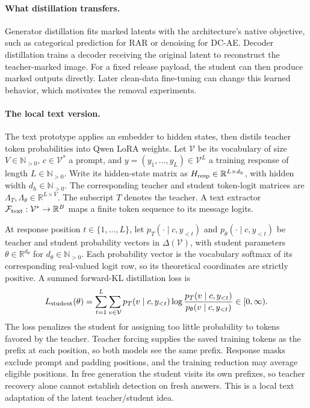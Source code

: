\paragraph{What distillation transfers.}
Generator distillation fits marked latents with the architecture's native objective, such as categorical prediction for RAR or denoising for DC-AE. Decoder distillation trains a decoder receiving the original latent to reconstruct the teacher-marked image. For a fixed release payload, the student can then produce marked outputs directly. Later clean-data fine-tuning can change this learned behavior, which motivates the removal experiments.

\paragraph{The local text version.}
The text prototype applies an embedder to hidden states, then distils teacher token probabilities into Qwen LoRA weights. Let $\mathcal V$ be its vocabulary of size $V\in\mathbb N_{>0}$, $c\in\mathcal V^*$ a prompt, and $y=(y_1,\ldots,y_L)\in\mathcal V^L$ a training response of length $L\in\mathbb N_{>0}$. Write its hidden-state matrix as $H_{\rm resp}\in\mathbb R^{L\times d_h}$, with hidden width $d_h\in\mathbb N_{>0}$. The corresponding teacher and student token-logit matrices are $\Lambda_T,\Lambda_\theta\in\mathbb R^{L\times V}$. The subscript $T$ denotes the teacher. A text extractor $\mathcal F_{\rm text}:\mathcal V^*\to\mathbb R^B$ maps a finite token sequence to its message logits.

At response position $t\in\{1,\ldots,L\}$, let $p_T(\cdot\mid c,y_{<t})$ and $p_\theta(\cdot\mid c,y_{<t})$ be teacher and student probability vectors in $\Delta(\mathcal V)$, with student parameters $\theta\in\mathbb R^{d_\theta}$ for $d_\theta\in\mathbb N_{>0}$. Each probability vector is the vocabulary softmax of its corresponding real-valued logit row, so its theoretical coordinates are strictly positive. A summed forward-KL distillation loss is
\begin{equation}
\label{eq:distseal-text-objective}
 L_{\rm student}(\theta)=\sum_{t=1}^L\sum_{v\in\mathcal V}
 p_T(v\mid c,y_{<t})
 \log\frac{p_T(v\mid c,y_{<t})}{p_\theta(v\mid c,y_{<t})}\in[0,\infty).
\end{equation}
The loss penalizes the student for assigning too little probability to tokens favored by the teacher. Teacher forcing supplies the saved training tokens as the prefix at each position, so both models see the same prefix. Response masks exclude prompt and padding positions, and the training reduction may average eligible positions. In free generation the student visits its own prefixes, so teacher recovery alone cannot establish detection on fresh answers. This is a local text adaptation of the latent teacher/student idea.

